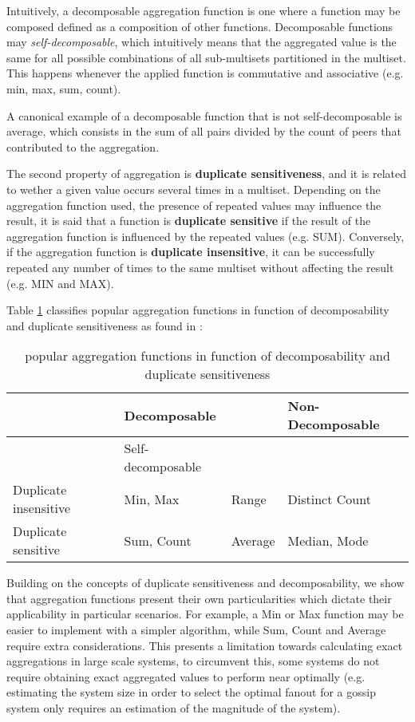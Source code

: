 Intuitively, a decomposable aggregation function is one where a function may be composed defined as a composition of other functions. Decomposable functions may \textit{self-decomposable}, which intuitively means that the aggregated value is the same for all possible combinations of all sub-multisets partitioned in the multiset. This happens whenever the applied function is commutative and associative (e.g. min, max, sum, count).

A canonical example of a decomposable function that is not self-decomposable is average, which consists in the sum of all pairs divided by the count of peers that contributed to the aggregation.

The second property of aggregation is \textbf{duplicate sensitiveness}, and it is related to wether a given value occurs several times in a multiset. Depending on the aggregation function used, the presence of repeated values may influence the result, it is said that a function is \textbf{duplicate sensitive} if the result of the aggregation function is influenced by the repeated values (e.g. SUM). Conversely, if the aggregation function is \textbf{duplicate insensitive}, it can be successfully repeated any number of times to the same multiset without affecting the result (e.g. MIN and MAX).

Table \ref{table:aggregation_functions} classifies popular aggregation functions in function of decomposability and duplicate sensitiveness as found in \cite{DBLP:journals/corr/abs-1110-0725}:

\begin{table}[]
    \begin{tabular}{|l|l|l|l|}
    \hline
                          & \multicolumn{2}{l|}{Decomposable} & Non-Decomposable  \\ \hline
                          & Self-decomposable    &                             &  \\ \hline
    Duplicate insensitive & Min, Max             & Range     & Distinct Count    \\ \hline
    Duplicate sensitive   & Sum, Count           & Average   & Median, Mode     \\ \hline
    \end{tabular}
    \caption{popular aggregation functions in function of decomposability and duplicate sensitiveness}
    \label{table:aggregation_functions}
\end{table}

Building on the concepts of duplicate sensitiveness and decomposability, we show that aggregation functions present their own particularities which dictate their applicability in particular scenarios. For example, a Min or Max function may be easier to implement with a simpler algorithm, while Sum, Count and Average require extra considerations. This presents a limitation towards calculating exact aggregations in large scale systems, to circumvent this, some systems do not require obtaining exact aggregated values to perform near optimally  (e.g. estimating the system size in order to select the optimal fanout for a gossip system only requires an estimation of the magnitude of the system). 

